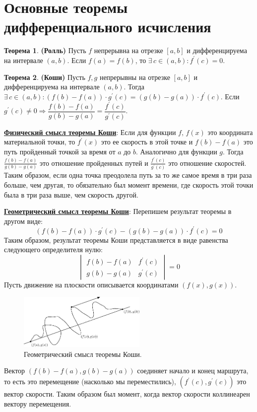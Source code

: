 \documentclass[12pt]{article}
\theoremstyle{definition}
\newtheorem{theorem}{Теорема}
\begin{document}
\section*{Основные теоремы дифференциального исчисления}
\begin{theorem}\textbf{(Ролль)}
	Пусть $f$ непрерывна на отрезке $[a,b]$ и дифференцируема на интервале $(a,b)$. Если $f(a) = f(b)$, то $\exists \, c \in (a,b) \colon f^\prime(c) = 0$.
\end{theorem}

\begin{theorem}\textbf{(Коши)}
	Пусть $f, g$ непрерывны на отрезке $[a,b]$ и дифференцируема на интервале $(a,b)$. Тогда $\exists \, c \in (a,b) \colon (f(b) - f(a)){\cdot}g^\prime(c) = (g(b) - g(a)){\cdot}f^\prime(c)$. Если $g^\prime(c) \neq 0 \Rightarrow \dfrac{f(b)-f(a)}{g(b) - g(a)} = \dfrac{f^\prime(c)}{g^\prime(c)}$.
\end{theorem}

\uline{\textbf{Физический смысл теоремы Коши}}: Если для функции $f, \, f(x)$ это координата материальной точки, то $f^\prime(x)$ это ее скорость в этой точке и $f(b)-f(a)$ это путь пройденный точкой за время от $a$ до $b$. Аналогично для функции $g$. Тогда $\tfrac{f(b) - f(a)}{g(b) - g(a)}$ это отношение пройденных путей и $\tfrac{f^\prime(c)}{g^\prime(c)}$ это отношение скоростей. Таким образом, если одна точка преодолела путь за то же самое время в три раза больше, чем другая, то обязательно был момент времени, где скорость этой точки была в три раза выше, чем скорость другой.

\uline{\textbf{Геометрический смысл теоремы Коши}}: Перепишем результат теоремы в другом виде: $$(f(b) - f(a)){\cdot}g^\prime(c) - (g(b) - g(a)){\cdot}f^\prime(c) = 0$$
Таким образом, результат теоремы Коши представляется в виде равенства следующего определителя нулю:
$$
\begin{vmatrix}
	f(b) - f(a) & f^\prime(c)\\
	g(b) - g(a) & g^\prime(c)
\end{vmatrix}
 = 0$$
Пусть движение на плоскости описывается координатами $(f(x),g(x))$. 

\begin{figure}[H]
	\centering
	\includegraphics[width=0.55\textwidth]{24_1.eps}
	\caption{Геометрический смысл теоремы Коши.}
	\label{24_1}
\end{figure}
Вектор $(f(b) - f(a), g(b) - g(a))$ соединяет начало и конец маршрута, то есть это перемещение (насколько мы переместились), $(f^\prime(c),g^\prime(c))$ это вектор скорости. Таким образом был момент, когда вектор скорости коллинеарен вектору перемещения.
\end{document}

